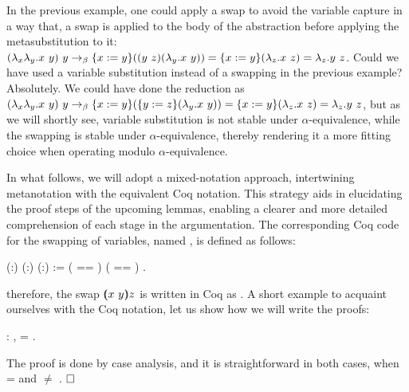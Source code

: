 In the previous example, one could apply a swap to avoid the variable capture in a way that, a swap is applied to the body of the abstraction before applying the metasubstitution to it: $(\lambda_x\lambda_y.x\ y)\ y \to_{\beta} \metasub{(\swap{y}{z}{(\lambda_y.x\ y)})}{x}{y} = \metasub{(\lambda_z.x\ z)}{x}{y} = \lambda_z.y\ z$. Could we have used a variable substitution instead of a swapping in the previous example? Absolutely. We could have done the reduction as $(\lambda_x\lambda_y.x\ y)\ y \to_{\beta} \metasub{(\metasub{(\lambda_y.x\ y)}{y}{z})}{x}{y} = \metasub{(\lambda_z.x\ z)}{x}{y} = \lambda_z.y\ z$, but as we will shortly see, variable substitution is not stable under $\alpha$-equivalence, while the swapping is stable under $\alpha$-equivalence, thereby rendering it a more fitting choice when operating modulo $\alpha$-equivalence.


In what follows, we will adopt a mixed-notation approach, intertwining metanotation with the equivalent Coq notation. This strategy aids in elucidating the proof steps of the upcoming lemmas, enabling a clearer and more detailed comprehension of each stage in the argumentation. The corresponding Coq code for the swapping of variables, named , is defined as follows: 
\begin{coqdoccode}
\coqdocemptyline
\coqdocnoindent
{}  (:) (:) (:) :=  ( == )     ( == )    .\coqdoceol
\coqdocemptyline
\end{coqdoccode}
\noindent therefore, the swap $\vswap{x}{y}{z}$ is written in Coq as    . A short example to acquaint ourselves with the Coq notation, let us show how we will write the proofs:
\begin{coqdoccode}
\coqdocemptyline
\coqdocnoindent
{} : \coqdockw{\ensuremath{\forall}}  ,     = .\coqdoceol
\end{coqdoccode}
 The proof is done by case analysis, and it is straightforward in both cases, when  =  and  \ensuremath{\not=} . $\hfill\Box$ 
\begin{coqdoccode}
\coqdocemptyline
\end{coqdoccode}
